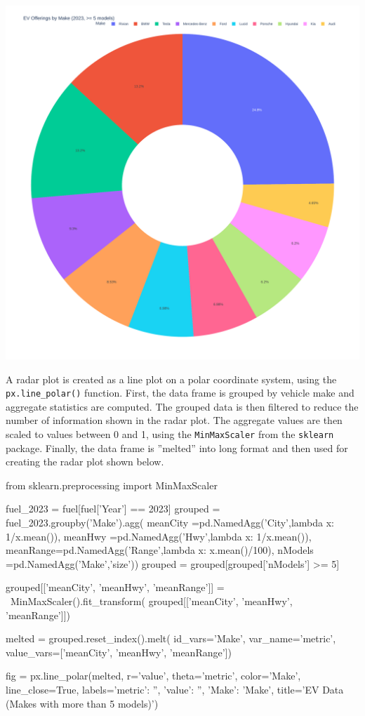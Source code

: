 \begin{center}
  \includegraphics[width=.6\textwidth]{px.fuel.donut.pdf}
\end{center}

A radar plot is created as a line plot on a polar coordinate system, using the \texttt{px.line\_polar()} function. First, the data frame is grouped by vehicle make and aggregate statistics are computed. The grouped data is then filtered to reduce the number of information shown in the radar plot. The aggregate values are then scaled to values between 0 and 1, using the \texttt{MinMaxScaler} from the \texttt{sklearn} package. Finally, the data frame is ''melted'' into long format and then used for creating the radar plot shown below. 

\begin{samepage}
\begin{pythoncode}
from sklearn.preprocessing import MinMaxScaler

fuel_2023 = fuel[fuel['Year'] == 2023]
grouped = fuel_2023.groupby('Make').agg(
    meanCity =pd.NamedAgg('City',lambda x: 1/x.mean()),
    meanHwy  =pd.NamedAgg('Hwy',lambda x: 1/x.mean()),
    meanRange=pd.NamedAgg('Range',lambda x: x.mean()/100),
    nModels  =pd.NamedAgg('Make','size'))
grouped = grouped[grouped['nModels'] >= 5]

grouped[['meanCity', 'meanHwy', 'meanRange']] = \
   MinMaxScaler().fit_transform(
      grouped[['meanCity', 'meanHwy', 'meanRange']])

melted = grouped.reset_index().melt(
    id_vars='Make', var_name='metric',
    value_vars=['meanCity', 'meanHwy', 'meanRange'])

fig = px.line_polar(melted, 
     r='value', 
     theta='metric', 
     color='Make', 
     line_close=True,
     labels={'metric': '', 'value': '', 'Make': 'Make'},
     title='EV Data (Makes with more than 5 models)')
\end{pythoncode}
\end{samepage}

